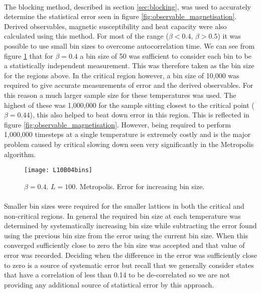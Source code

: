 \documentclass[12pt] {report} %
\begin{document}
			\paragraph{}
				The blocking method, described in section \ref{sec:blocking}, was used to accurately determine the statistical error seen in figure \ref{fig:observable_magnetisation}. Derived observables, magnetic susceptibility and heat capacity were also calculated using this method. For most of the range ($\beta < 0.4$, $\beta > 0.5$) it was possible to use small bin sizes to overcome autocorrelation time. We can see from figure \ref{fig:L10B04bins} that for $\beta = 0.4$ a bin size of 50 was sufficient to consider each bin to be a statistically independent measurement. This was therefore taken as the bin size for the regions above. In the critical region however, a bin size of 10,000 was required to give accurate measurements of error and the derived observables. For this reason a much larger sample size for these temperatures was used. The highest of these was 1,000,000 for the sample sitting closest to the critical point ($\beta = 0.44$), this also helped to beat down error in this region. This is reflected in figure \ref{fig:observable_magnetisation}. However, being required to perform 1,000,000 timesteps at a single temperature is extremely costly and is the major problem caused by critical slowing down seen very significantly in the Metropolis algorithm.
 			
			\begin{figure}[H]
				\centering
				\texttt{[image: L10B04bins]}
				\caption{$\beta = 0.4$. $L=100$. Metropolis. Error for increasing bin size.}
				\label{fig:L10B04bins}
			\end{figure}
				
			\paragraph{}
				Smaller bin sizes were required for the smaller lattices in both the critical and non-critical regions. In general the required bin size at each temperature was determined by systematically increasing bin size while subtracting the error found using the previous bin size from the error using the current bin size. When this converged sufficiently close to zero the bin size was accepted and that value of error was recorded. Deciding when the difference in the error was sufficiently close to zero is a source of systematic error but recall that we generally consider states that have a correlation of less than 0.14 to be de-correlated so we are not providing any additional source of statistical error by this approach.
\end{document}

